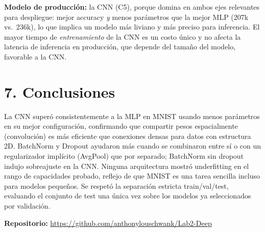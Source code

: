\documentclass[9pt]{extarticle}
\begin{document}
\textbf{Modelo de producción:} la CNN (C5), porque domina en ambos ejes relevantes para despliegue: mejor accuracy \emph{y} menos parámetros que la mejor MLP (207k vs.\ 236k), lo que implica un modelo más liviano y más preciso para inferencia. El mayor tiempo de \emph{entrenamiento} de la CNN es un costo único y no afecta la latencia de inferencia en producción, que depende del tamaño del modelo, favorable a la CNN.

\section*{7. Conclusiones}
La CNN superó consistentemente a la MLP en MNIST usando menos parámetros en su mejor configuración, confirmando que compartir pesos espacialmente (convolución) es más eficiente que conexiones densas para datos con estructura 2D. BatchNorm y Dropout ayudaron más cuando se combinaron entre sí o con un regularizador implícito (AvgPool) que por separado; BatchNorm sin dropout indujo sobreajuste en la CNN. Ninguna arquitectura mostró underfitting en el rango de capacidades probado, reflejo de que MNIST es una tarea sencilla incluso para modelos pequeños. Se respetó la separación estricta train/val/test, evaluando el conjunto de test una única vez sobre los modelos ya seleccionados por validación.

\vspace{4pt}
\textbf{Repositorio:} \url{https://github.com/anthonylouschwank/Lab2-Deep}
\end{document}
